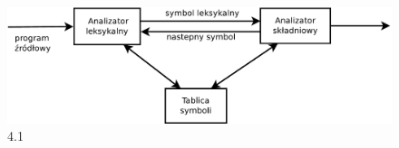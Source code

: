 \documentclass[a4paper,11pt]{article}
\begin{document}
 
\begin{figure}[!htb]
\centerline{\includegraphics[scale=0.6]{Diagram1.pdf}}
\caption{4.1}
\label{fig:ukladPrzekaznikowy}
\end{figure}

 
\end{document}
